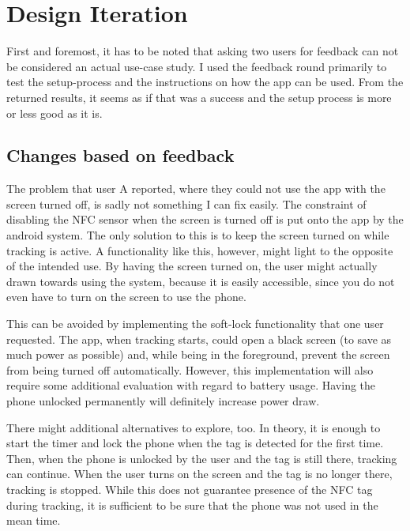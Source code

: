 \documentclass[conference]{IEEEtran}
\begin{document}
\section{Design Iteration}
First and foremost, it has to be noted that asking two users for feedback can not be considered an actual use-case study. I used the feedback round primarily to test the setup-process and the instructions on how the app can be used. From the returned results, it seems as if that was a success and the setup process is more or less good as it is.

\subsection{Changes based on feedback}
The problem that user A reported, where they could not use the app with the screen turned off, is sadly not something I can fix easily. The constraint of disabling the NFC sensor when the screen is turned off is put onto the app by the android system. The only solution to this is to keep the screen turned on while tracking is active. A functionality like this, however, might light to the opposite of the intended use. By having the screen turned on, the user might actually drawn towards using the system, because it is easily accessible, since you do not even have to turn on the screen to use the phone.

This can be avoided by implementing the soft-lock functionality that one user requested. The app, when tracking starts, could open a black screen (to save as much power as possible) and, while being in the foreground, prevent the screen from being turned off automatically.
However, this implementation will also require some additional evaluation with regard to battery usage. Having the phone unlocked permanently will definitely increase power draw.

There might additional alternatives to explore, too. In theory, it is enough to start the timer and lock the phone when the tag is detected for the first time. Then, when the phone is unlocked by the user and the tag is still there, tracking can continue. When the user turns on the screen and the tag is no longer there, tracking is stopped. While this does not guarantee presence of the NFC tag during tracking, it is sufficient to be sure that the phone was not used in the mean time.
\end{document}
